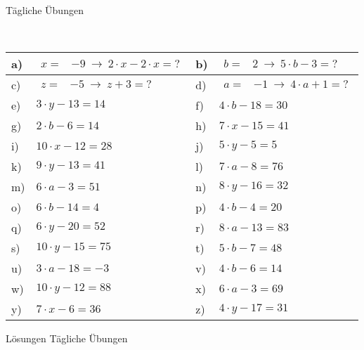\documentclass[12pt]{article}
\begin{document}
\centerline{{\Large Tägliche Übungen}} 
\vspace{1cm}
\noindent \\


\begin{xltabular}{\textwidth}{|C{0.75cm}|X|C{0.75cm}|X|}
\hline
a)&$\begin{aligned}
 x=&-9~ \rightarrow ~ 2 \cdot x - 2 \cdot x=?
\end{aligned}$
&
b)&$\begin{aligned}
 b=&2~ \rightarrow ~ 5 \cdot b - 3=?
\end{aligned}$
\\\hline
c)&$\begin{aligned}
 z=&-5~ \rightarrow ~ z + 3=?
\end{aligned}$
&
d)&$\begin{aligned}
 a=&-1~ \rightarrow ~ 4 \cdot a + 1=?
\end{aligned}$
\\\hline
e)&$3\cdot y-13=14$
&
f)&$4\cdot b-18=30$
\\\hline
g)&$2\cdot b-6=14$
&
h)&$7\cdot x-15=41$
\\\hline
i)&$10\cdot x-12=28$
&
j)&$5\cdot y-5=5$
\\\hline
k)&$9\cdot y-13=41$
&
l)&$7\cdot a-8=76$
\\\hline
m)&$6\cdot a-3=51$
&
n)&$8\cdot y-16=32$
\\\hline
o)&$6\cdot b-14=4$
&
p)&$4\cdot b-4=20$
\\\hline
q)&$6\cdot y-20=52$
&
r)&$8\cdot a-13=83$
\\\hline
s)&$10\cdot y-15=75$
&
t)&$5\cdot b-7=48$
\\\hline
u)&$3\cdot a-18=-3$
&
v)&$4\cdot b-6=14$
\\\hline
w)&$10\cdot y-12=88$
&
x)&$6\cdot a-3=69$
\\\hline
y)&$7\cdot x-6=36$
&
z)&$4\cdot y-17=31$
\\\hline
\end{xltabular}
\vspace{0.5cm}
\newpage
{}
\centerline{{\large Lösungen Tägliche Übungen}} 
\vspace{0.5cm}
\end{document}
